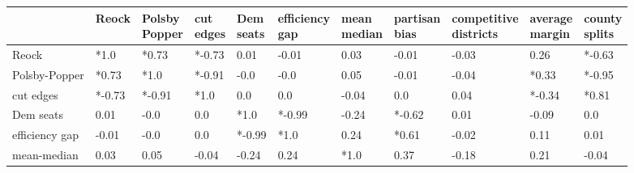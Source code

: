\begin{tabular}{lllllllllll}
\toprule
{} &   Reock & \makecell{Polsby \\ Popper} & \makecell{cut \\ edges} & \makecell{Dem \\ seats} & \makecell{efficiency \\ gap} & \makecell{mean \\ median} & \makecell{partisan \\ bias} & \makecell{competitive \\ districts} & \makecell{average \\ margin} & \makecell{county \\ splits} \\
\midrule
Reock                 &    *1.0 &                       *0.73 &                  *-0.73 &                    0.01 &                        -0.01 &                      0.03 &                       -0.01 &                               -0.03 &                         0.26 &                      *-0.63 \\
Polsby-Popper         &   *0.73 &                        *1.0 &                  *-0.91 &                    -0.0 &                         -0.0 &                      0.05 &                       -0.01 &                               -0.04 &                        *0.33 &                      *-0.95 \\
cut edges             &  *-0.73 &                      *-0.91 &                    *1.0 &                     0.0 &                          0.0 &                     -0.04 &                         0.0 &                                0.04 &                       *-0.34 &                       *0.81 \\
Dem seats             &    0.01 &                        -0.0 &                     0.0 &                    *1.0 &                       *-0.99 &                     -0.24 &                      *-0.62 &                                0.01 &                        -0.09 &                         0.0 \\
efficiency gap        &   -0.01 &                        -0.0 &                     0.0 &                  *-0.99 &                         *1.0 &                      0.24 &                       *0.61 &                               -0.02 &                         0.11 &                        0.01 \\
mean-median           &    0.03 &                        0.05 &                   -0.04 &                   -0.24 &                         0.24 &                      *1.0 &                        0.37 &                               -0.18 &                         0.21 &                       -0.04 \\

\end{tabular}
